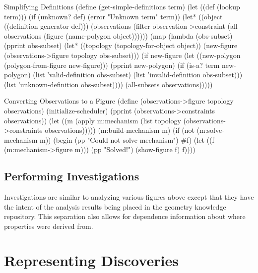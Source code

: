 \begin{code-listing}{Simplifying Definitions}
(define (get-simple-definitions term)
  (let ((def (lookup term)))
    (if (unknown? def)
        (error "Unknown term" term))
    (let* ((object ((definition-generator def)))
           (observations
            (filter
             observation->constraint
             (all-observations
              (figure (name-polygon object))))))
      (map
       (lambda (obs-subset)
         (pprint obs-subset)
         (let* ((topology (topology-for-object object))
                (new-figure
                 (observations->figure topology obs-subset)))
           (if new-figure
               (let ((new-polygon
                      (polygon-from-figure new-figure)))
                 (pprint new-polygon)
                 (if (is-a? term new-polygon)
                     (list 'valid-definition
                           obs-subset)
                     (list 'invalid-definition
                           obs-subset)))
               (list 'unknown-definition
                     obs-subset))))
       (all-subsets observations)))))
\end{code-listing}



\begin{code-listing}{Converting Observations to a Figure}
(define (observations->figure topology observations)
  (initialize-scheduler)
  (pprint (observations->constraints observations))
  (let ((m (apply
            m:mechanism
            (list
             topology
             (observations->constraints observations)))))
    (m:build-mechanism m)
    (if (not (m:solve-mechanism m))
        (begin
          (pp "Could not solve mechanism")
          #f)
        (let ((f (m:mechanism->figure m)))
          (pp "Solved!")
          (show-figure f)
          f))))
\end{code-listing}


\subsection{Performing Investigations}

Investigations are similar to analyzing various figures above except
that they have the intent of the analysis results being placed in the
geometry knowledge repository. This separation also allows for
dependence information about where properties were derived from.

\section{Representing Discoveries}

